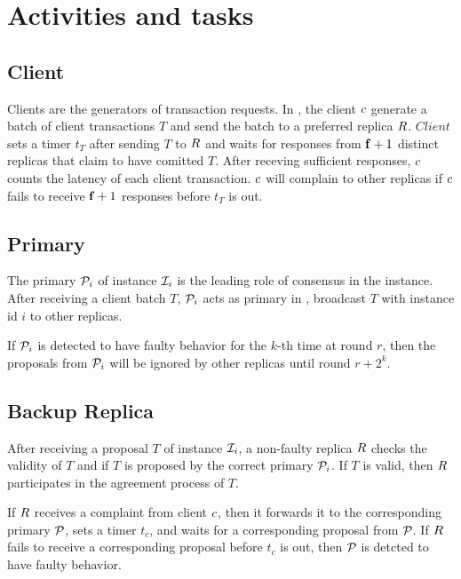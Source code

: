 \section{Activities and tasks}

\subsection{Client}

\par Clients are the generators of transaction requests. In \RCC{}, the client $\Client{}$ generate a batch 
of client transactions $T$ and send the batch to a preferred replica $\Replica{}$. $Client{}$ sets a timer 
$t_T$ after sending $T$ to $\Replica{}$ and waits for responses from $\mathbf{f}+1$ distinct replicas that claim 
to have comitted $T$. After receving sufficient responses, $\Client{}$ counts the latency of each client 
transaction. $\Client{}$ will complain to other replicas if $\Client{}$ fails to receive $\mathbf{f}+1$ responses 
before $t_T$ is out.

\subsection{Primary}

\par The primary $\mathcal{P}_{i}$ of instance $\mathcal{I}_{i}$ is the leading role of consensus in the 
instance. After receiving a client batch $T$, $\mathcal{P}_{i}$ acts as primary in \PBFT{}, broadcast $T$ 
with instance id $i$ to other replicas.

\par If $\mathcal{P}_{i}$ is detected to have faulty behavior for the $k$-th time at round $r$, then the proposals 
from $\mathcal{P}_{i}$ will be ignored by other replicas until round $r + 2^k$.

\subsection{Backup Replica}

\par After receiving a proposal $T$ of instance $\mathcal{I}_{i}$, a non-faulty replica $\Replica{}$ 
checks the validity of $T$ and if $T$ is proposed by the correct primary $\mathcal{P}_{i}$. If $T$ is valid, 
then $\Replica{}$ participates in the \PBFT{} agreement process of $T$.

\par If $\Replica{}$ receives a complaint from client $\Client{}$, then it forwards it to the corresponding 
primary $\mathcal{P}_{}$, sets a timer $t_c$, and waits for a corresponding proposal from $\mathcal{P}_{}$. If $\Replica{}$ 
fails to receive a corresponding proposal before $t_c$ is out, then $\mathcal{P}_{}$ is detcted to have faulty behavior. 

